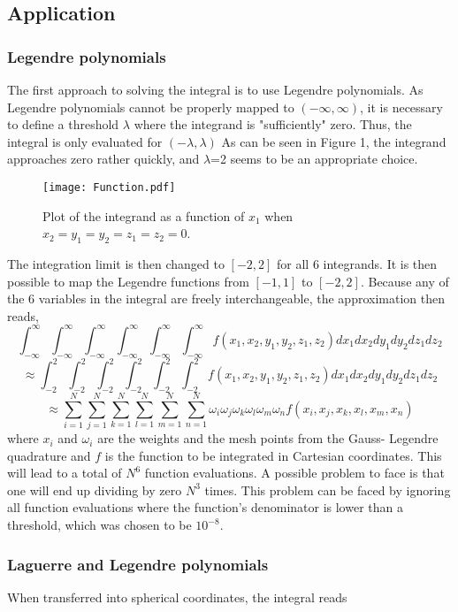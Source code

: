 \documentclass[10pt,a4paper]{article}
\begin{document}
\subsection{Application}
\subsubsection{Legendre polynomials}
The first approach to solving the integral is to use Legendre polynomials. As Legendre polynomials cannot be properly mapped to $(-\infty,\infty)$, it is necessary to define a threshold $\lambda$ where the integrand is "sufficiently" zero. Thus, the integral is only evaluated for $(-\lambda,\lambda)$ As can be seen in Figure 1, the integrand approaches zero rather quickly, and $\lambda$=2 seems to be an appropriate choice.
\begin{figure}[H]
\centering
\texttt{[image: Function.pdf]}
\caption[Plot of function]{Plot of the integrand as a function of $x_1$ when $x_2=y_1=y_2=z_1=z_2=0$.}
\end{figure}
The integration limit is then changed to $[-2,2]$ for all 6 integrands. It is then possible to map the Legendre functions from $[-1,1]$ to $[-2,2]$. Because any of the 6 variables in the integral are freely interchangeable, the approximation then reads,
$$\int_{-\infty}^{\infty}\int_{-\infty}^{\infty}\int_{-\infty}^{\infty}\int_{-\infty}^{\infty}\int_{-\infty}^{\infty}\int_{-\infty}^{\infty}f(x_1,x_2,y_1,y_2,z_1,z_2)dx_1dx_2dy_1dy_2dz_1dz_2$$
$$\approx\int_{-2}^{2}\int_{-2}^{2}\int_{-2}^{2}\int_{-2}^{2}\int_{-2}^{2}\int_{-2}^{2}f(x_1,x_2,y_1,y_2,z_1,z_2)dx_1dx_2dy_1dy_2dz_1dz_2 $$
$$\approx\sum_{i=1}^{N}\sum_{j=1}^{N}\sum_{k=1}^{N}\sum_{l=1}^{N}\sum_{m=1}^{N}\sum_{n=1}^{N}\omega_i\omega_j\omega_k\omega_l\omega_m\omega_nf(x_i,x_j,x_k,x_l,x_m,x_n)$$
where $x_i$ and $\omega_i$ are the weights and the mesh points from the Gauss- Legendre quadrature and $f$ is the function to be integrated in Cartesian coordinates.
This will lead to a total of $N^6$ function evaluations. A possible problem to face is that one will end up dividing by zero $N^3$ times. This problem can be faced by ignoring all function evaluations where the function's denominator is lower than a threshold, which was chosen to be $10^{-8}$.
\subsubsection{Laguerre and Legendre polynomials}
When transferred into spherical coordinates, the integral reads
\end{document}
